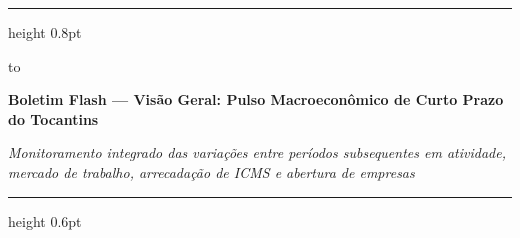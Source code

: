 \documentclass[10pt,a4paper]{article}
\begin{document}
\color{cinzatexto}

%
\par\vspace{2pt}%
{\color{douradoto}\hrule height 0.8pt}%
\par\vspace{6pt}%
\noindent\hbox to %
\par\vspace{5pt}%
{\fontsize{14.5}{17.4}\selectfont\bfseries\color{corprimaria}Boletim Flash — Visão Geral: Pulso Macroeconômico de Curto Prazo do Tocantins\par}%
\vspace{3pt}%
{\footnotesize\itshape\color{cinzasub}Monitoramento integrado das variações entre períodos subsequentes em atividade, mercado de trabalho, arrecadação de ICMS e abertura de empresas\par}%
\par\vspace{6pt}%
{\color{cinzaborda}\hrule height 0.6pt}%

\vspace{0.14cm}
\end{document}
